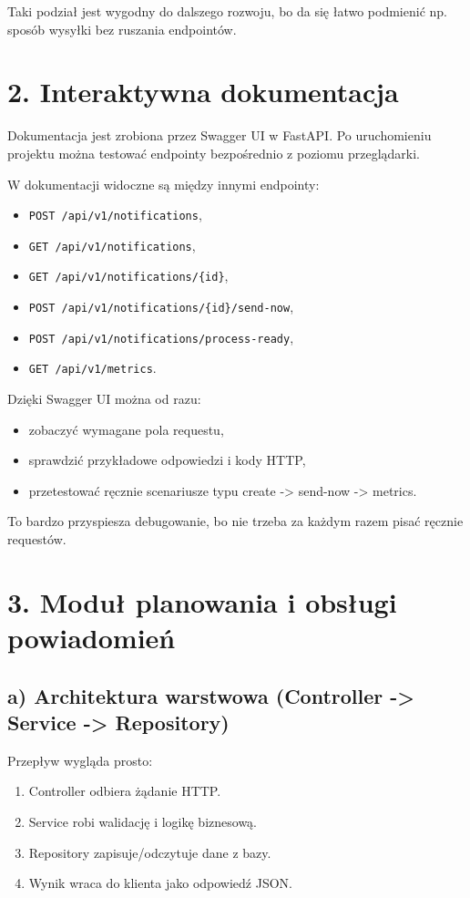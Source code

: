\documentclass[a4paper,12pt]{article}
\begin{document}
Taki podział jest wygodny do dalszego rozwoju, bo da się łatwo podmienić np. sposób wysyłki bez ruszania endpointów.

\section*{2. Interaktywna dokumentacja}

Dokumentacja jest zrobiona przez Swagger UI w FastAPI. Po uruchomieniu projektu można testować endpointy bezpośrednio z poziomu przeglądarki.

W dokumentacji widoczne są między innymi endpointy:
\begin{itemize}[leftmargin=1.5em]
    \item \texttt{POST /api/v1/notifications},
    \item \texttt{GET /api/v1/notifications},
    \item \texttt{GET /api/v1/notifications/\{id\}},
    \item \texttt{POST /api/v1/notifications/\{id\}/send-now},
    \item \texttt{POST /api/v1/notifications/process-ready},
    \item \texttt{GET /api/v1/metrics}.
\end{itemize}

Dzięki Swagger UI można od razu:
\begin{itemize}[leftmargin=1.5em]
    \item zobaczyć wymagane pola requestu,
    \item sprawdzić przykładowe odpowiedzi i kody HTTP,
    \item przetestować ręcznie scenariusze typu create -> send-now -> metrics.
\end{itemize}

To bardzo przyspiesza debugowanie, bo nie trzeba za każdym razem pisać ręcznie requestów.

\section*{3. Moduł planowania i obsługi powiadomień}

\subsection*{a) Architektura warstwowa (Controller -> Service -> Repository)}

Przepływ wygląda prosto:
\begin{enumerate}[leftmargin=1.8em]
    \item Controller odbiera żądanie HTTP.
    \item Service robi walidację i logikę biznesową.
    \item Repository zapisuje/odczytuje dane z bazy.
    \item Wynik wraca do klienta jako odpowiedź JSON.
\end{enumerate}
\end{document}
